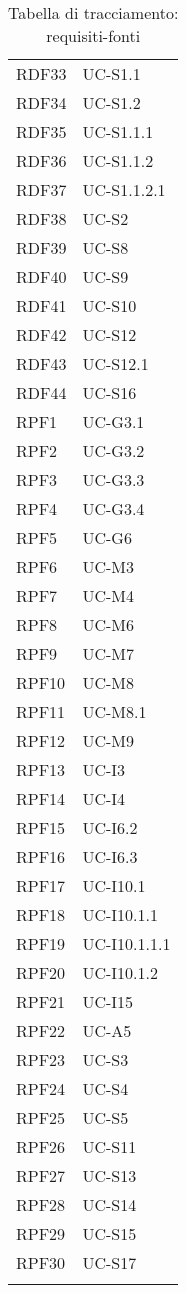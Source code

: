 \begin{longtable}{| p{5cm} | p{5cm} |}
		RDF33 & UC-S1.1\\
		\rowcolor{LightGray}
		RDF34 & UC-S1.2\\
		RDF35 & UC-S1.1.1\\
		\rowcolor{LightGray}
		RDF36 & UC-S1.1.2\\
		RDF37 & UC-S1.1.2.1 \\
		\rowcolor{LightGray}
		RDF38 & UC-S2\\
		RDF39 & UC-S8\\
		\rowcolor{LightGray}
		RDF40 & UC-S9\\
		RDF41 & UC-S10\\
		\rowcolor{LightGray}
		RDF42 & UC-S12 \\
		RDF43 & UC-S12.1 \\
		\rowcolor{LightGray}
		RDF44 & UC-S16\\
		RPF1 & UC-G3.1\\
		\rowcolor{LightGray}
		RPF2 & UC-G3.2\\
		RPF3 & UC-G3.3\\
		\rowcolor{LightGray}
		RPF4 & UC-G3.4\\
		RPF5 & UC-G6\\
		\rowcolor{LightGray}
		RPF6 & UC-M3\\
		RPF7 & UC-M4\\
		\rowcolor{LightGray}
		RPF8 & UC-M6\\
		RPF9 & UC-M7\\
		\rowcolor{LightGray}
		RPF10 & UC-M8\\
		RPF11 & UC-M8.1\\
		\rowcolor{LightGray}
		RPF12 & UC-M9\\
		RPF13 & UC-I3\\
		\rowcolor{LightGray}
		RPF14 & UC-I4\\
		RPF15 & UC-I6.2\\
		\rowcolor{LightGray}
		RPF16 & UC-I6.3\\
		RPF17 & UC-I10.1\\
		\rowcolor{LightGray}
		RPF18 & UC-I10.1.1\\
		RPF19 & UC-I10.1.1.1\\
		\rowcolor{LightGray}
		RPF20 & UC-I10.1.2\\		
		RPF21 & UC-I15\\
		\rowcolor{LightGray}
		RPF22 & UC-A5\\
		RPF23 & UC-S3\\
		\rowcolor{LightGray}
		RPF24 & UC-S4\\
		RPF25 & UC-S5\\
		\rowcolor{LightGray}
		RPF26 & UC-S11\\
		RPF27 & UC-S13\\
		\rowcolor{LightGray}
		RPF28 & UC-S14\\	
		RPF29 & UC-S15\\
		\rowcolor{LightGray}
		RPF30 & UC-S17\\
		\hline
		\caption{Tabella di tracciamento: requisiti-fonti}
\end{longtable}

